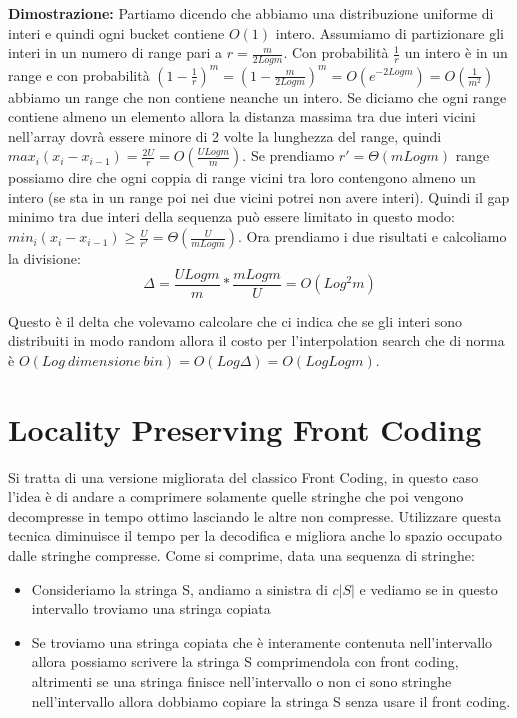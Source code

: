 \documentclass[14pt]{extreport}
\begin{document}
\textbf{Dimostrazione:} Partiamo dicendo che abbiamo una distribuzione uniforme di interi e quindi ogni bucket contiene $O(1)$ intero. 
Assumiamo di partizionare gli interi in un numero di range pari a $r=\frac{m}{2Logm}$. Con probabilità $\frac{1}{r}$ un intero è in un range e con probabilità $(1-\frac{1}{r})^m = (1-\frac{m}{2Logm})^m = O(e^{-2Logm}) = O(\frac{1}{m^2})$ abbiamo un range che non contiene neanche un intero.
Se diciamo che ogni range contiene almeno un elemento allora la distanza massima tra due interi vicini nell'array dovrà essere minore di 2 volte la lunghezza del range, quindi $max_i(x_i-x_{i-1})=\frac{2U}{r}=O(\frac{ULogm}{m})$.
Se prendiamo $r' = \Theta(mLogm)$ range possiamo dire che ogni coppia di range vicini tra loro contengono almeno un intero (se sta in un range poi nei due vicini potrei non avere interi).
Quindi il gap minimo tra due interi della sequenza può essere limitato in questo modo: $min_i(x_i-x_{i-1})\geq \frac{U}{r'} = \Theta(\frac{U}{mLogm})$.
Ora prendiamo i due risultati e calcoliamo la divisione:
\begin{equation}
    \Delta = \frac{ULogm}{m}*\frac{mLogm}{U} = O(Log^2 m)
\end{equation}

Questo è il delta che volevamo calcolare che ci indica che se gli interi sono distribuiti in modo random allora il costo per l'interpolation search che di norma è $O(Log \ dimensione\ bin) = O(Log \Delta) = O(Log Log m)$.

\section{Locality Preserving Front Coding}

Si tratta di una versione migliorata del classico Front Coding, in questo caso l'idea è di andare a comprimere solamente quelle stringhe che poi vengono decompresse in tempo ottimo lasciando le altre non compresse.
Utilizzare questa tecnica diminuisce il tempo per la decodifica e migliora anche lo spazio occupato dalle stringhe compresse.
Come si comprime, data una sequenza di stringhe:
\begin{itemize}
\item Consideriamo la stringa S, andiamo a sinistra di $c|S|$ e vediamo se in questo intervallo troviamo una stringa copiata
\item Se troviamo una stringa copiata che è interamente contenuta nell'intervallo allora possiamo scrivere la stringa S comprimendola con front coding, altrimenti se una stringa finisce nell'intervallo o non ci sono stringhe nell'intervallo allora dobbiamo copiare la stringa S senza usare il front coding.
\end{itemize}
\end{document}
